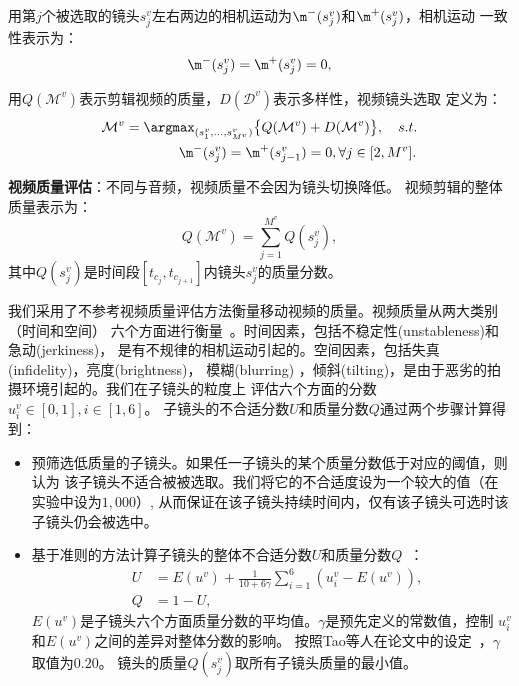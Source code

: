 用第$j$个被选取的镜头$s_j^v$左右两边的相机运动为$\m^-(s_j^v)$和$\m^+(s_j^v)$，相机运动
一致性表示为：
\begin{equation}
	\m^-(s_j^v) = \m^+(s_{j}^v) = 0,
\end{equation}

用$Q(\mathcal{M}^v)$表示剪辑视频的质量，$D(\mathcal{D}^v)$表示多样性，视频镜头选取
定义为：
\begin{equation}
	\begin{aligned}
		\mathcal{M}^v = \argmax_{(s_1^v, \ldots, s_{M^v}^v)}\big\{Q(\mathcal{M}^v)& + D(\mathcal{M}^v)\big\}, \quad s.t. \\
		\m^-(s_j^v) = \m^+(s_{j - 1}^v) &= 0, \forall j \in [2,M^v].
	\end{aligned}
	\label{equ:mashup-formu-vss}
\end{equation}

\textbf{视频质量评估}：不同与音频，视频质量不会因为镜头切换降低。
视频剪辑的整体质量表示为：
\begin{equation}
	Q(\mathcal{M}^v) = \sum_{j=1}^{M^v}{Q(s_j^v)},
\end{equation}
其中$Q(s_j^v)$是时间段$[t_{c_j},t_{c_{j+1}}]$内镜头$s_j^v$的质量分数。

我们采用了不参考视频质量评估方法衡量移动视频的质量。视频质量从两大类别（时间和空间）
六个方面进行衡量~\cite{MeiHZZL07}。时间因素，包括不稳定性(unstableness)和急动(jerkiness)，
是有不规律的相机运动引起的。空间因素，包括失真(infidelity)，亮度(brightness)，
模糊(blurring) ，倾斜(tilting)，是由于恶劣的拍摄环境引起的。我们在子镜头的粒度上
评估六个方面的分数$u_i^v \in [0,1], i \in [1,6]$。
子镜头的不合适分数$U$和质量分数$Q$通过两个步骤计算得到：
\begin{itemize}
    \item 预筛选低质量的子镜头。如果任一子镜头的某个质量分数低于对应的阈值，则认为
        该子镜头不适合被被选取。我们将它的不合适度设为一个较大的值（在实验中设为$1,000$）,
        从而保证在该子镜头持续时间内，仅有该子镜头可选时该子镜头仍会被选中。
    \item 基于准则的方法计算子镜头的整体不合适分数$U$和质量分数$Q$~\cite{MeiHZZL07}：
        \begin{eqnarray}
            &U &= E(u^v) + \frac{1}{10 + 6\gamma}\sum_{i=1}^6{(u_i^v -
            E(u^v))}, \nonumber \\
            &Q &= 1 - U,
        \end{eqnarray}
        $E(u^v)$是子镜头六个方面质量分数的平均值。$\gamma$是预先定义的常数值，控制
        $u_i^v$和$E(u^v)$之间的差异对整体分数的影响。
        按照Tao等人在论文中的设定~\cite{MeiHZZL07}，$\gamma$取值为$0.20$。
        镜头的质量$Q(s_j^v)$取所有子镜头质量的最小值。
\end{itemize}

